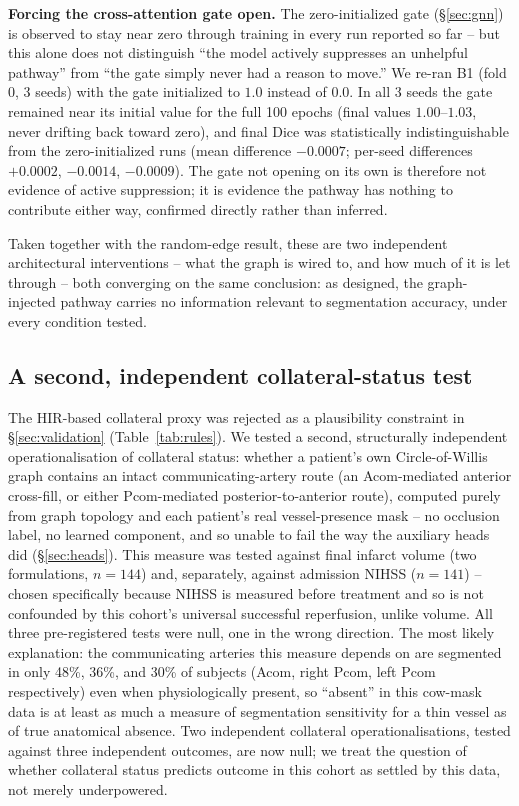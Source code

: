 \documentclass[conference]{IEEEtran}
\begin{document}
\textbf{Forcing the cross-attention gate open.} The zero-initialized gate (\S\ref{sec:gnn}) is observed to stay near zero through training in every run reported so far -- but this alone does not distinguish ``the model actively suppresses an unhelpful pathway'' from ``the gate simply never had a reason to move.'' We re-ran B1 (fold 0, 3 seeds) with the gate initialized to $1.0$ instead of $0.0$. In all 3 seeds the gate remained near its initial value for the full 100 epochs (final values $1.00$--$1.03$, never drifting back toward zero), and final Dice was statistically indistinguishable from the zero-initialized runs (mean difference $-0.0007$; per-seed differences $+0.0002$, $-0.0014$, $-0.0009$). The gate not opening on its own is therefore not evidence of active suppression; it is evidence the pathway has nothing to contribute either way, confirmed directly rather than inferred.

Taken together with the random-edge result, these are two independent architectural interventions -- what the graph is wired to, and how much of it is let through -- both converging on the same conclusion: as designed, the graph-injected pathway carries no information relevant to segmentation accuracy, under every condition tested.

\subsection{A second, independent collateral-status test}
\label{sec:secondcollateral}

The HIR-based collateral proxy was rejected as a plausibility constraint in \S\ref{sec:validation} (Table~\ref{tab:rules}). We tested a second, structurally independent operationalisation of collateral status: whether a patient's own Circle-of-Willis graph contains an intact communicating-artery route (an Acom-mediated anterior cross-fill, or either Pcom-mediated posterior-to-anterior route), computed purely from graph topology and each patient's real vessel-presence mask -- no occlusion label, no learned component, and so unable to fail the way the auxiliary heads did (\S\ref{sec:heads}). This measure was tested against final infarct volume (two formulations, $n=144$) and, separately, against admission NIHSS ($n=141$) -- chosen specifically because NIHSS is measured before treatment and so is not confounded by this cohort's universal successful reperfusion, unlike volume. All three pre-registered tests were null, one in the wrong direction. The most likely explanation: the communicating arteries this measure depends on are segmented in only 48\%, 36\%, and 30\% of subjects (Acom, right Pcom, left Pcom respectively) even when physiologically present, so ``absent'' in this cow-mask data is at least as much a measure of segmentation sensitivity for a thin vessel as of true anatomical absence. Two independent collateral operationalisations, tested against three independent outcomes, are now null; we treat the question of whether collateral status predicts outcome in this cohort as settled by this data, not merely underpowered.
\end{document}
